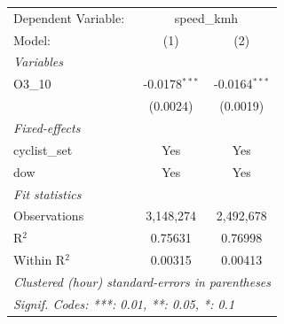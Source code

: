 \begingroup
\centering
\begin{tabular}{lcc}
   \tabularnewline \midrule \midrule
   Dependent Variable: & \multicolumn{2}{c}{speed\_kmh}\\
   Model:        & (1)             & (2)\\  
   \midrule
   \emph{Variables}\\
   O3\_10        & -0.0178$^{***}$ & -0.0164$^{***}$\\   
                 & (0.0024)        & (0.0019)\\   
   \midrule
   \emph{Fixed-effects}\\
   cyclist\_set  & Yes             & Yes\\  
   dow           & Yes             & Yes\\  
   \midrule
   \emph{Fit statistics}\\
   Observations  & 3,148,274       & 2,492,678\\  
   R$^2$         & 0.75631         & 0.76998\\  
   Within R$^2$  & 0.00315         & 0.00413\\  
   \midrule \midrule
   \multicolumn{3}{l}{\emph{Clustered (hour) standard-errors in parentheses}}\\
   \multicolumn{3}{l}{\emph{Signif. Codes: ***: 0.01, **: 0.05, *: 0.1}}\\
\end{tabular}
\par\endgroup
